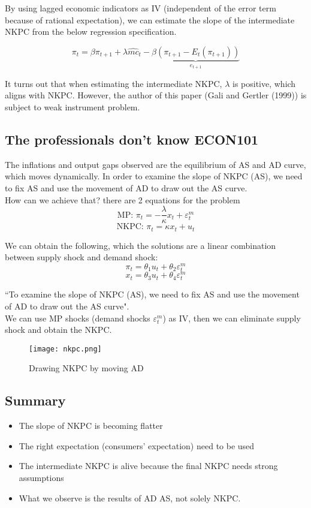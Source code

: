 \documentclass{article}
\begin{document}
\noindent By using lagged economic indicators as IV (independent of the error term because of rational expectation), we can estimate the slope of the intermediate NKPC from the below regression specification.

$$\pi_t = \beta \pi_{t+1} + \lambda \hat{mc}_t - \underbrace{\beta (\pi_{t+1} - E_t(\pi_{t+1}))}_{e_{t+1}}$$

\noindent It turns out that when estimating the intermediate NKPC, $\lambda$ is positive, which aligns with NKPC. However, the author of this paper (Gali and Gertler (1999)) is subject to weak instrument problem.

\subsection{The professionals don't know ECON101}
The inflations and output gaps observed are the equilibrium of AS and AD curve, which moves dynamically. In order to examine the slope of NKPC (AS), we need to fix AS and use the movement of AD to draw out the AS curve.\\

\noindent How can we achieve that? there are 2 equations for the problem
$$\text{MP: } \pi_t = -\frac{\lambda}{\kappa}x_t + \varepsilon_t^m$$
$$\text{NKPC: } \pi_t = \kappa x_t + u_t$$

\noindent We can obtain the following, which the solutions are a linear combination between supply shock and demand shock:
$$\pi_t = \theta_1 u_t + \theta_2 \varepsilon_t^m$$
$$x_t = \theta_3 u_t + \theta_4 \varepsilon_t^m$$

\noindent ``To examine the slope of NKPC (AS), we need to fix AS and use the movement of AD to draw out the AS curve".\\
\noindent We can use MP shocks (demand shocks $\varepsilon_t^m$) as IV, then we can eliminate supply shock and obtain the NKPC.

\begin{figure}[h!]
    \centering
    \texttt{[image: nkpc.png]}
    \caption{Drawing NKPC by moving AD}
    \label{fig:enter-label}
\end{figure}

\subsection{Summary}
\begin{itemize}
    \item The slope of NKPC is becoming flatter
    \item The right expectation (consumers' expectation) need to be used
    \item The intermediate NKPC is alive because the final NKPC needs strong assumptions
    \item What we observe is the results of AD AS, not solely NKPC.
\end{itemize}
\end{document}
